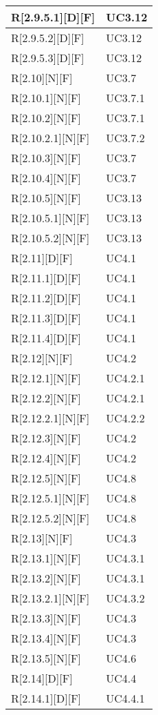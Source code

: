 \begin{longtable}{X | X}
R[2.9.5.1][D][F] & UC3.12 \\
\hline
R[2.9.5.2][D][F] & UC3.12 \\
\hline
R[2.9.5.3][D][F] & UC3.12 \\
\hline
R[2.10][N][F] & UC3.7 \\
\hline
R[2.10.1][N][F] & UC3.7.1 \\
\hline
R[2.10.2][N][F] & UC3.7.1 \\
\hline
R[2.10.2.1][N][F] & UC3.7.2 \\
\hline
R[2.10.3][N][F] & UC3.7 \\
\hline
R[2.10.4][N][F] & UC3.7 \\
\hline
R[2.10.5][N][F] & UC3.13 \\
\hline
R[2.10.5.1][N][F] & UC3.13 \\
\hline
R[2.10.5.2][N][F] & UC3.13 \\
\hline
R[2.11][D][F] & UC4.1 \\
\hline
R[2.11.1][D][F] & UC4.1 \\
\hline
R[2.11.2][D][F] & UC4.1 \\
\hline
R[2.11.3][D][F] & UC4.1 \\
\hline
R[2.11.4][D][F] & UC4.1 \\
\hline
R[2.12][N][F] & UC4.2 \\
\hline
R[2.12.1][N][F] & UC4.2.1 \\
\hline
R[2.12.2][N][F] & UC4.2.1 \\
\hline
R[2.12.2.1][N][F] & UC4.2.2 \\
\hline
R[2.12.3][N][F] & UC4.2 \\
\hline
R[2.12.4][N][F] & UC4.2 \\
\hline
R[2.12.5][N][F] & UC4.8 \\
\hline
R[2.12.5.1][N][F] & UC4.8 \\
\hline
R[2.12.5.2][N][F] & UC4.8 \\
\hline
R[2.13][N][F] & UC4.3 \\
\hline
R[2.13.1][N][F] & UC4.3.1 \\
\hline
R[2.13.2][N][F] & UC4.3.1 \\
\hline
R[2.13.2.1][N][F] & UC4.3.2 \\
\hline
R[2.13.3][N][F] & UC4.3 \\
\hline
R[2.13.4][N][F] & UC4.3 \\
\hline
R[2.13.5][N][F] & UC4.6 \\
\hline
R[2.14][D][F] & UC4.4 \\
\hline
R[2.14.1][D][F] & UC4.4.1 \\

\end{longtable}
